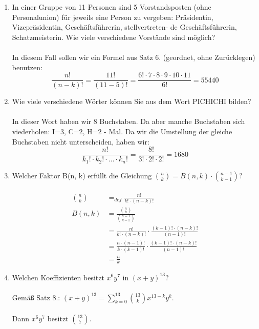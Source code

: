 \begin{enumerate}[label=(\alph*)]
        \item In einer Gruppe von 11 Personen sind 5 Vorstandsposten (ohne Personalunion) für jeweils
        eine Person zu vergeben: Präsidentin, Vizepräsidentin, Geschäftsführerin, stellvertreten-
        de Geschäftsführerin, Schatzmeisterin. Wie viele verschiedene Vorstände sind möglich?\\\\
        In diesem Fall sollen wir ein Formel aus Satz 6. (geordnet, ohne Zur\"ucklegen) benutzen:
        \[\frac{n!}{(n-k)!}=\frac{11!}{(11-5)!}
        =\frac{6!\cdot7\cdot8\cdot9\cdot10\cdot11}{6!}
        =55440\]

        \item Wie viele verschiedene Wörter können Sie aus dem Wort PICHICHI bilden?\\\\
        In dieser Wort haben wir 8 Buchstaben. Da aber manche Buchstaben sich viederholen: 
        I=3, C=2, H=2 - Mal. Da wir die Umstellung der gleiche Buchstaben nicht unterscheiden, haben wir:
        \[\frac{n!}{k_1!\cdot k_2!\cdot\ldots\cdot k_n!} = \frac{8!}{3!\cdot2!\cdot2!} = 1680\]

        \item Welcher Faktor B(n, k) erfüllt die Gleichung $\binom{n}{k} = B(n,k)\cdot\binom{n-1}{k-1}$?\\\\
        \begin{align*}
        \binom{n}{k} &=_{def} \frac{n!}{k!\cdot(n-k)!}\\
        B(n,k) &= \frac{\binom{n}{k}}{\binom{n-1}{k-1}}\\
        &= \frac{n!}{k!\cdot(n-k)!} \cdot \frac{(k-1)!\cdot(n-k)!}{(n-1)!}\\
        &= \frac{n\cdot(n-1)!}{k\cdot(k-1)!} \cdot \frac{(k-1)!\cdot(n-k)!}{(n-1)!}\\
        &= \frac{n}{k}
        \end{align*}
        
        \item Welchen Koeffizienten besitzt $x^6y^7$ in $(x+y)^{13}$?\\\\
        Gemäß Satz 8.: $(x+y)^{13} = \sum_{k=0}^{13} \binom{13}{k}x^{13-k}y^k$.\\\\
        Dann $x^6y^7$ besitzt $\binom{13}{7}$.


\end{enumerate}
